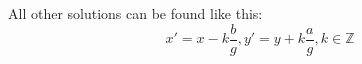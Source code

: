 All other solutions can be found like this:
$$x' = x - k \frac{b}{g}, y' = y + k \frac{a}{g}, k \in \mathbb{Z}$$